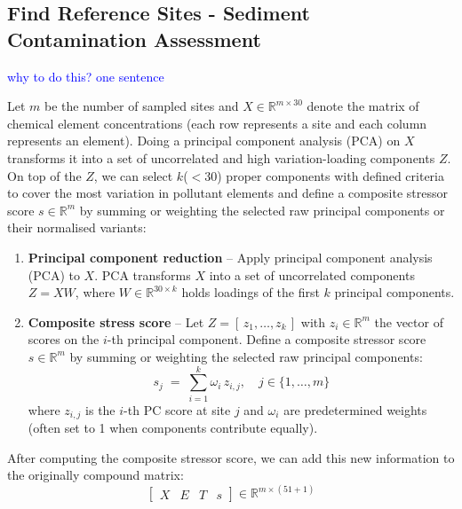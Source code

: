 \subsection{Find Reference Sites - Sediment Contamination Assessment}
\textcolor{blue}{why to do this? one sentence}

Let \(m\) be the number of sampled sites and \(X \in \mathbb{R}^{m \times 30}\) denote the matrix of chemical element concentrations (each row represents a site and each column represents an element).
Doing a principal component analysis (PCA) on \(X\) transforms it into a set of uncorrelated and high variation-loading components \(Z\).
On top of the \(Z\), we can select \(k\)(\(< 30\)) proper components with defined criteria to cover the most variation in pollutant elements
and define a composite stressor score \(s \in \mathbb{R}^{m}\)
by summing or weighting the selected raw principal components or their normalised variants:


\begin{enumerate}
    \item \textbf{Principal component reduction} – Apply principal component analysis (PCA) to \(X\).  PCA transforms \(X\) into a set of uncorrelated components \(Z = X W\), where \(W \in \mathbb{R}^{30\times k}\) holds loadings of the first \(k\) principal components.

    \item \textbf{Composite stress score} – Let \(Z = [\,z_1,\dots,z_k\,]\) with \(z_i \in \mathbb{R}^{m}\) the vector of scores on the \(i\)-th principal component. 
     Define a composite stressor score \(s \in \mathbb{R}^{m}\) by summing or weighting the selected raw principal components:
    \[
    s_j \;=\;\sum_{i=1}^k \omega_i\,z_{i,j}, \quad j \in \{1,\dots,m\}
    \]
    where \(z_{i,j}\) is the \(i\)-th PC score at site \(j\) and \(\omega_i\) are predetermined weights (often set to 1 when components contribute equally).
\end{enumerate}

After computing the composite stressor score, we can add this new information to the originally compound matrix:
\[
\left[
\begin{array}{cccc}
X & E & T & s
\end{array}
\right] 
\in
\mathbb{R}^{m \times (51 + 1)}
\]

